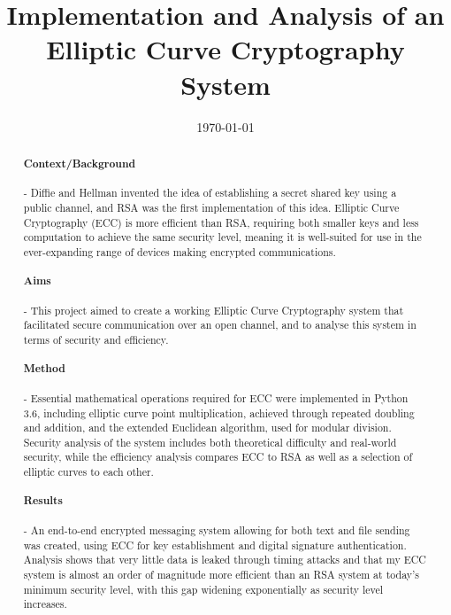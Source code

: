 \documentclass[12pt,a4paper]{article}
\title{Implementation and Analysis of an Elliptic Curve Cryptography System}
\date{\today}
\begin{document}
\maketitle

\begin{abstract}

    \vspace{-5mm}
    \paragraph{Context/Background} -
    Diffie and Hellman invented the idea of establishing a secret shared key using a public channel, and 
    RSA was the first implementation of this idea. 
    Elliptic Curve Cryptography (ECC) is more efficient than RSA, requiring both smaller keys and less computation to achieve the same security level, meaning it is well-suited for use in the ever-expanding range of devices making encrypted communications. 
    
    \vspace{-5mm}
    \paragraph{Aims} -
    This project aimed to create a working Elliptic Curve Cryptography system that facilitated secure communication over an open channel, 
    and to analyse this system in terms of security and efficiency. 

    \vspace{-5mm}
    \paragraph{Method} -
    Essential mathematical operations required for ECC were implemented in Python 3.6, including elliptic curve point multiplication, achieved through repeated doubling and addition, and the extended Euclidean algorithm, used for modular division. 
    Security analysis of the system includes both theoretical difficulty and real-world security, 
    while the efficiency analysis compares ECC to RSA as well as a selection of elliptic curves to each other. 

    \vspace{-5mm}
    \paragraph{Results} -
    An end-to-end encrypted messaging system allowing for both text and file sending was created, using ECC for key establishment and digital signature authentication. 
    Analysis shows that very little data is leaked through timing attacks and that my ECC system is almost an order of magnitude more efficient than an RSA system at today's minimum security level, with this gap widening exponentially as security level increases. 


\end{abstract}
\end{document}
